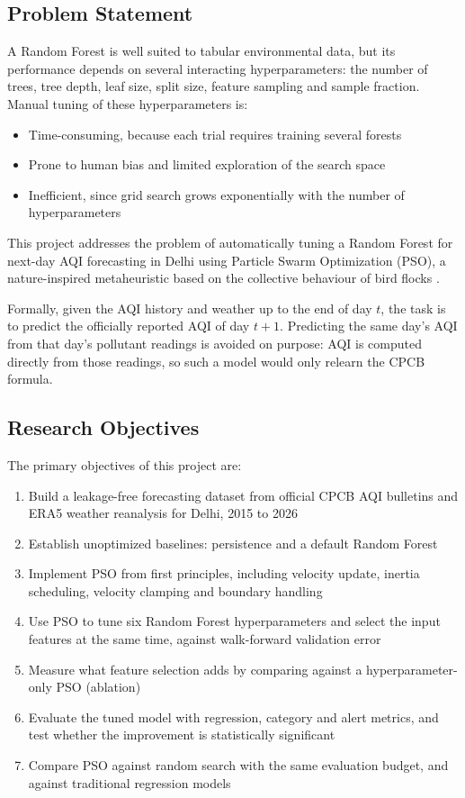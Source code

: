\subsection{Problem Statement}
A Random Forest \cite{breiman2001} is well suited to tabular environmental data, but its performance depends on several interacting hyperparameters: the number of trees, tree depth, leaf size, split size, feature sampling and sample fraction. Manual tuning of these hyperparameters is:
\begin{itemize}
\item Time-consuming, because each trial requires training several forests
\item Prone to human bias and limited exploration of the search space
\item Inefficient, since grid search grows exponentially with the number of hyperparameters
\end{itemize}

This project addresses the problem of automatically tuning a Random Forest for next-day AQI forecasting in Delhi using Particle Swarm Optimization (PSO), a nature-inspired metaheuristic based on the collective behaviour of bird flocks \cite{kennedy1995}.

Formally, given the AQI history and weather up to the end of day $t$, the task is to predict the officially reported AQI of day $t+1$. Predicting the same day's AQI from that day's pollutant readings is avoided on purpose: AQI is computed directly from those readings, so such a model would only relearn the CPCB formula.

\subsection{Research Objectives}
The primary objectives of this project are:
\begin{enumerate}
\item Build a leakage-free forecasting dataset from official CPCB AQI bulletins and ERA5 weather reanalysis for Delhi, 2015 to 2026
\item Establish unoptimized baselines: persistence and a default Random Forest
\item Implement PSO from first principles, including velocity update, inertia scheduling, velocity clamping and boundary handling
\item Use PSO to tune six Random Forest hyperparameters and select the input features at the same time, against walk-forward validation error
\item Measure what feature selection adds by comparing against a hyperparameter-only PSO (ablation)
\item Evaluate the tuned model with regression, category and alert metrics, and test whether the improvement is statistically significant
\item Compare PSO against random search with the same evaluation budget, and against traditional regression models
\end{enumerate}

